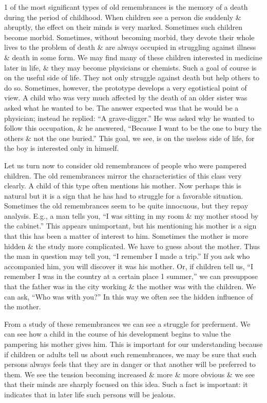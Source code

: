 \documentclass{article}
\begin{document}
1 of the most significant types of old remembrances is the memory of a death during the period of childhood. When children see a person die suddenly \& abruptly, the effect on their minds is very marked. Sometimes such children become morbid. Sometimes, without becoming morbid, they devote their whole lives to the problem of death \& are always occupied in struggling against illness \& death in some form. We may find many of these children interested in medicine later in life, \& they may become physicians or chemists. Such a goal of course is on the useful side of life. They not only struggle against death but help others to do so. Sometimes, however, the prototype develops a very egotistical point of view. A child who was very much affected by the death of an older sister was asked what he wanted to be. The answer expected was that he would be a physician; instead he replied: ``A grave-digger.'' He was asked why he wanted to follow this occupation, \& he answered, ``Because I want to be the one to bury the others \& not the one buried.'' This goal, we see, is on the useless side of life, for the boy is interested only in himself.

Let us turn now to consider old remembrances of people who were pampered children. The old remembrances mirror the characteristics of this class very clearly. A child of this type often mentions his mother. Now perhaps this is natural but it is a sign that he has had to struggle for a favorable situation. Sometimes the old remembrances seem to be quite innocuous, but they repay analysis. E.g., a man tells you, ``I was sitting in my room \& my mother stood by the cabinet.'' This appears unimportant, but his mentioning his mother is a sign that this has been a matter of interest to him. Sometimes the mother is more hidden \& the study more complicated. We have to guess about the mother. Thus the man in question may tell you, ``I remember I made a trip.'' If you ask who accompanied him, you will discover it was his mother. Or, if children tell us, ``I remember I was in the country at a certain place 1 summer,'' we can presuppose that the father was in the city working \& the mother was with the children. We can ask, ``Who was with you?'' In this way we often see the hidden influence of the mother.

From a study of these remembrances we can see a struggle for preferment. We can see how a child in the course of his development begins to value the pampering his mother gives him. This is important for our understanding because if children or adults tell us about such remembrances, we may be sure that such persons always feels that they are in danger or that another will be preferred to them. We see the tension becoming increased \& more \& more obvious \& we see that their minds are sharply focused on this idea. Such a fact is important: it indicates that in later life such persons will be jealous.
\end{document}
